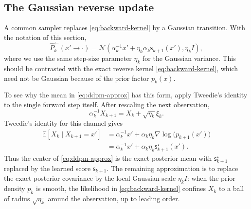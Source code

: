 \documentclass[10pt,a4paper]{amsart}
\numberwithin{equation}{section}
\newcommand{\E}{\mathbb{E}}
\newcommand{\Id}{I}
\newcommand{\wh}[1]{\widehat{#1}}
\newcommand{\sstar}{\mathsf{s}^{\star}}
\newcommand{\score}{\mathsf{s}}
\newcommand{\normal}[2]{\mathcal{N}\!\left(#1,#2\right)}
\begin{document}
\subsection{The Gaussian reverse update}

A common sampler replaces \eqref{eq:backward-kernel} by a Gaussian transition.
With the notation of this section,
\begin{equation}\label{eq:ddpm-approx}
    \wh P_k^{\leftarrow}(x' \to \cdot)
    =
    \normal{\alpha_k^{-1}x'+\eta_k\alpha_k\score_{k+1}(x')}
    {\eta_k\Id},
\end{equation}
where we use the same step-size parameter $\eta_k$ for the Gaussian variance.
This should be contrasted with the exact reverse kernel
\eqref{eq:backward-kernel}, which need not be Gaussian because of the prior
factor $p_k(x)$.

To see why the mean in \eqref{eq:ddpm-approx} has this form, apply Tweedie's
identity to the single forward step itself.  After rescaling the next
observation,
\[
    \alpha_k^{-1}X_{k+1}
    =
    X_k+\sqrt{\eta_k}\xi_k.
\]
Tweedie's identity for this channel gives
\[
\begin{aligned}
    \E[X_k\mid X_{k+1}=x']
    & =
    \alpha_k^{-1}x'
    +
    \alpha_k \eta_k\nabla\log\bigl( p_{k+1}(x')\bigr) \\
    & =
    \alpha_k^{-1}x'
    +
    \alpha_k \eta_k \sstar_{k+1}(x').
\end{aligned}
\]
Thus the center of \eqref{eq:ddpm-approx} is the exact posterior mean with
$\sstar_{k+1}$ replaced by the learned score $\score_{k+1}$.  The remaining
approximation is to replace the exact posterior covariance by the local Gaussian
scale $\eta_k\Id$: when the prior density $p_k$ is smooth, the likelihood in
\eqref{eq:backward-kernel} confines $X_k$ to a ball of radius
$\sqrt{\eta_k}$ around the observation, up to leading order.
\end{document}
